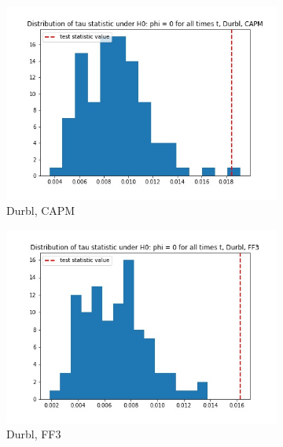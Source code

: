 \documentclass{article}
\begin{document}
\begin{figure}
\centering
  \begin{subfigure}[b]{0.3\textwidth}
    \includegraphics[width=\textwidth]{Durbl/tau_hist_02_CAPM.jpg}
    \caption{Durbl, CAPM}
    \label{fig:1}
  \end{subfigure}
  \begin{subfigure}[b]{0.3\textwidth}
    \includegraphics[width=\textwidth]{Durbl/tau_hist_02_FF3.jpg}
    \caption{Durbl, FF3}
    \label{fig:2}
  \end{subfigure}
   \begin{subfigure}[b]{0.3\textwidth}

\end{subfigure}
\end{figure}
\end{document}
